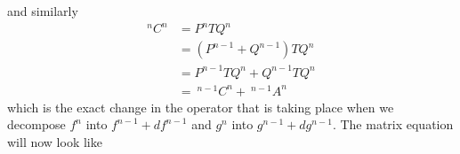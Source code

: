 and similarly
\begin{align}
	\nonumber
	^nC^n 	&= P^nTQ^n\\
	\nonumber
			&= (P^{n-1}+Q^{n-1})TQ^n\\
	\nonumber
			&= P^{n-1}TQ^n + Q^{n-1}TQ^n\\
			&=\ ^{n-1}C^n +\ ^{n-1}A^n
	\label{eq:Cdecomp}
\end{align}
which is the exact change in the operator that is taking place when we 
decompose $f^n$ into $f^{n-1}+df^{n-1}$ and $g^n$ into $g^{n-1} + dg^{n-1}$.
The matrix equation will now look like
